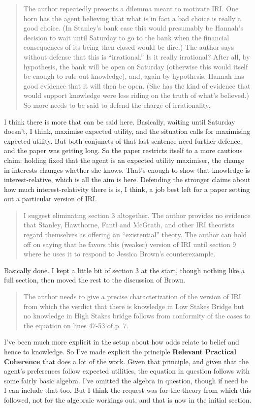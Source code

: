 \documentclass[]{article}
\newcommand{\reviewer}[1]{
\begin{quote}
#1
\end{quote}
\noindent}
\begin{document}
\reviewer{The author repeatedly presents a dilemma meant to motivate IRI.  One horn has the agent believing that what is in fact a bad choice is really a good choice.  (In Stanley's bank case this would presumably be Hannah's decision to wait until Saturday to go to the bank when the financial consequences of its being then closed would be dire.)  The author says without defense that this is ``irrational.''  Is it really irrational?  After all, by hypothesis, the bank will be open on Saturday (otherwise this would itself be enough to rule out knowledge), and, again by hypothesis, Hannah has good evidence that it will then be open.  (She has the kind of evidence that would support knowledge were less riding on the truth of what's believed.)  So more needs to be said to defend the charge of irrationality.}%
I think there is more that can be said here. Basically, waiting until Saturday doesn't, I think, maximise expected utility, and the situation calls for maximising expected utility. But both conjuncts of that last sentence need further defence, and the paper was getting long. So the paper restricts itself to a more cautious claim: holding fixed that the agent is an expected utility maximiser, the change in interests changes whether she knows. That's enough to show that knowledge is interest-relative, which is all the aim is here. Defending the stronger claims about how much interest-relativity there is is, I think, a job best left for a paper setting out a particular version of IRI.

\reviewer{I suggest eliminating section 3 altogether.  The author provides no evidence that Stanley, Hawthorne, Fantl and McGrath, and other IRI theorists regard themselves as offering an ``existential'' theory.  The author can hold off on saying that he favors this (weaker) version of IRI until section 9 where he uses it to respond to Jessica Brown's counterexample.}%
Basically done. I kept a little bit of section 3 at the start, though nothing like a full section, then moved the rest to the discussion of Brown.

\reviewer{The author needs to give a precise characterization of the version of IRI from which the verdict that there is knowledge in Low Stakes Bridge but no knowledge in High Stakes bridge follows from conformity of the cases to the equation on lines 47-53 of p. 7.}%
I've been much more explicit in the setup about how odds relate to belief and hence to knowledge. So I've made explicit the principle \textbf{Relevant Practical Coherence} that does a lot of the work. Given that principle, and given that the agent's preferences follow expected utilities, the equation in question follows with some fairly basic algebra. I've omitted the algebra in question, though if need be I can include that too. But I think the request was for the theory from which this followed, not for the algebraic workings out, and that is now in the initial section.
\end{document}
